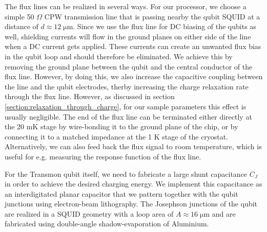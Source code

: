 \smallskip

The flux lines can be realized in several ways. For our processor, we choose a simple 50 $\Omega$ CPW transmission line that is passing nearby the qubit SQUID at a distance of $d\approx 12\;\mathrm{\mu m}$. Since we use the flux line for DC biasing of the qubits as well, shielding currents will flow in the ground planes on either side of the line when a DC current gets applied. These currents can create an unwanted flux bias in the qubit loop and should therefore be eliminated. We achieve this by removing the ground plane between the qubit and the central conductor of the flux line. However, by doing this, we also increase the capacitive coupling between the line and the qubit electrodes, therby increasing the charge relaxation rate through the flux line. However, as discussed in section \ref{section:relaxation_through_charge}, for our sample parameters this effect is usually negligible. The end of the flux line can be terminated either directly at the 20 mK stage by wire-bonding it to the ground plane of the chip, or by connecting it to a matched impedance at the 1 K stage of the cryostat. Alternatively, we can also feed back the flux signal to room temperature, which is useful for e.g. measuring the response function of the flux line.

\smallskip

For the Transmon qubit itself, we need to fabricate a large shunt capacitance $C_J$ in order to achieve the desired charging energy. We implement this capacitance as an interdigitated planar capacitor that we pattern together with the qubit junctions using electron-beam lithography. The Josephson junctions of the qubit are realized in a SQUID geometry with a loop area of $A\approx 16\;\mathrm{\mu m}$ and are fabricated using double-angle shadow-evaporation of Aluminium.

